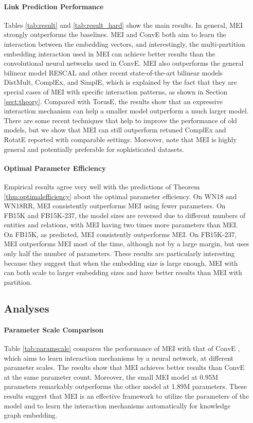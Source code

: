 \documentclass{ecai}
\theoremstyle{plain}  \newtheorem{thm}{Theorem}  \newtheorem{lem}[thm]{Lemma}  \newtheorem{prop}[thm]{Proposition}
\theoremstyle{remark}  \newtheorem*{rem}{Remark}
\begin{document}
\paragraph{Link Prediction Performance}
Tables \ref{tab:result} and \ref{tab:result_hard} show the main results. In general, MEI strongly outperforms the baselines. MEI and ConvE both aim to learn the interaction between the embedding vectors, and interestingly, the multi-partition embedding interaction used in MEI can achieve better results than the convolutional neural networks used in ConvE. MEI also outperforms the general bilinear model RESCAL and other recent state-of-the-art bilinear models DistMult, ComplEx, and SimplE, which is explained by the fact that they are special cases of MEI with specific interaction patterns, as shown in Section \ref{sect:theory}. Compared with TorusE, the results show that an expressive interaction mechanism can help a smaller model outperform a much larger model. There are some recent techniques that help to improve the performance of old models, but we show that MEI can still outperform retuned ComplEx and RotatE reported with comparable settings. Moreover, note that MEI is highly general and potentially preferable for sophisticated datasets.

\paragraph{Optimal Parameter Efficiency}
Empirical results agree very well with the predictions of Theorem \ref{thm:optimalefficiency} about the optimal parameter efficiency. On WN18 and WN18RR, MEI consistently outperforms MEI using fewer parameters. On FB15K and FB15K-237, the model sizes are reversed due to different numbers of entities and relations, with MEI having two times more parameters than MEI. On FB15K, as predicted, MEI consistently outperforms MEI. On FB15K-237, MEI outperforms MEI most of the time, although not by a large margin, but uses only half the number of parameters. These results are particularly interesting because they suggest that when the embedding size  is large enough, MEI with  can both scale to larger embedding sizes and have better results than MEI with  partition.

\subsection{Analyses} \paragraph{Parameter Scale Comparison}
Table \ref{tab:paramscale} compares the performance of MEI with that of ConvE \cite{dettmers_convolutional2dknowledge_2018}, which aims to learn interaction mechanisms by a neural network, at different parameter scales. The results show that MEI achieves better results than ConvE at the same parameter count. Moreover, the small MEI model at 0.95M parameters remarkably outperforms the other model at 1.89M parameters. These results suggest that MEI is an effective framework to utilize the parameters of the model and to learn the interaction mechanisms automatically for knowledge graph embedding.
\end{document}
